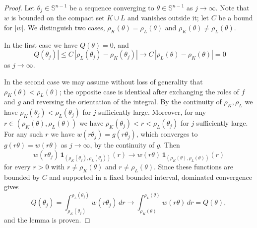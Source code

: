 \documentclass{amsart}
\theoremstyle{remark}
\newcommand{\Sph}{\mathbb{S}}
\newcommand{\dd}{\,d}
\begin{document}
\begin{proof}
Let $\theta_j\in\Sph^{n-1}$ be a sequence converging to
$\theta\in\Sph^{n-1}$ as $j\to\infty$. Note that $w$ is bounded on the
compact set $K\cup L$ and vanishes outside it; let $C$ be a bound for $|w|$.
We distinguish two cases, $\rho_K(\theta)=\rho_L(\theta)$ and
$\rho_K(\theta)\neq\rho_L(\theta)$.

In the first case we have $Q(\theta)=0$, and
\[
 |Q(\theta_j)|
 \leq C\,|\rho_L(\theta_j)-\rho_K(\theta_j)|
 \longrightarrow C\,|\rho_L(\theta)-\rho_K(\theta)|=0
\]
as $j\to\infty$.

In the second case we may assume without loss of generality that
$\rho_K(\theta)<\rho_L(\theta)$; the opposite case is identical after
exchanging the roles of $f$ and $g$ and reversing the orientation of the
integral. By the continuity of $\rho_K,\rho_L$ we have
$\rho_K(\theta_j)<\rho_L(\theta_j)$ for $j$ sufficiently large. Moreover, for
any $r\in(\rho_K(\theta),\rho_L(\theta))$ we have
$\rho_K(\theta_j)<r<\rho_L(\theta_j)$ for $j$ sufficiently large. For any such
$r$ we have $w(r\theta_j)=g(r\theta_j)$, which converges to
$g(r\theta)=w(r\theta)$ as $j\to\infty$, by the continuity of $g$. Then
\[
 w(r\theta_j)\,\mathbf 1_{(\rho_K(\theta_j),\rho_L(\theta_j))}(r)
 \longrightarrow
 w(r\theta)\,\mathbf 1_{(\rho_K(\theta),\rho_L(\theta))}(r)
\]
for every $r>0$ with $r\neq\rho_K(\theta)$ and $r\neq\rho_L(\theta)$. Since
these functions are bounded by $C$ and supported in a fixed bounded interval,
dominated convergence gives
\[
 Q(\theta_j)=\int_{\rho_K(\theta_j)}^{\rho_L(\theta_j)}w(r\theta_j)\dd r
 \longrightarrow
 \int_{\rho_K(\theta)}^{\rho_L(\theta)}w(r\theta)\dd r=Q(\theta),
\]
and the lemma is proven.
\end{proof}
\end{document}
